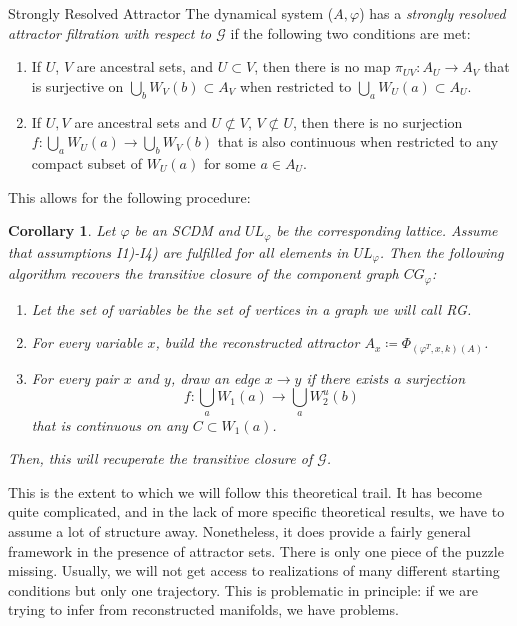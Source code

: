 \documentclass[11pt, a4paper]{memoir}
\theoremstyle{break}
\newtheorem{cor}{Corollary}
\theoremstyle{break}
\theoremstyle{nonumberplain}
\begin{document}
\begin{mydefinition}{Strongly Resolved Attractor}
The dynamical system ($A,\varphi$) has a \emph{strongly resolved attractor filtration with respect to $\mathcal{G}$} if the following two conditions are met:
\begin{enumerate}[label=\arabic*)]
	\item If $U$, $V$ are ancestral sets, and $U\subset V$, then there is no map $\pi_{UV}:A_U\to A_V$ that is surjective on $\bigcup_b W_V(b)\subset A_V$ when restricted to $\bigcup_a W_U(a)\subset A_U$.
	\item If $U,V$ are ancestral sets and $U\not\subset V$, $V\not\subset U$, then there is no surjection $f:\bigcup_{a} W_U(a)\to\bigcup_b W_V(b)$ that is also continuous when restricted to any compact subset of $W_U(a)$ for some $a\in A_U$.
\end{enumerate}
\end{mydefinition}
This allows for the following procedure:
\begin{cor}
Let $\varphi$ be an SCDM and $UL_\varphi$ be the corresponding lattice. Assume that assumptions I1)-I4) are fulfilled for all elements in $UL_\varphi$. Then the following algorithm recovers the transitive closure of the component graph $CG_\varphi$:
\begin{enumerate}[label=\roman*.]
	\item Let the set of variables be the set of vertices in a graph we will call \emph{RG}.
	\item For every variable $x$, build the reconstructed attractor $A_x\coloneqq \Phi	_{(\varphi^T,x,k)(A)}$.
	\item For every pair $x$ and $y$, draw an edge $x\to y$ if there exists a surjection
	 $$f:\bigcup_a W_1(a) \to \bigcup_a W_2^u(b)$$ 
	 that is continuous on any $C\subset W_1(a)$.
\end{enumerate}
Then, this will recuperate the transitive closure of $\mathcal{G}$.
\end{cor}
This is the extent to which we will follow this theoretical trail. It has become quite complicated, and in the lack of more specific theoretical results, we have to assume a lot of structure away. Nonetheless, it does provide a fairly general framework in the presence of attractor sets. There is only one piece of the puzzle missing. Usually, we will not get access to realizations of many different starting conditions but only one trajectory. This is problematic in principle: if we are trying to infer from reconstructed manifolds, we have problems.
\end{document}
